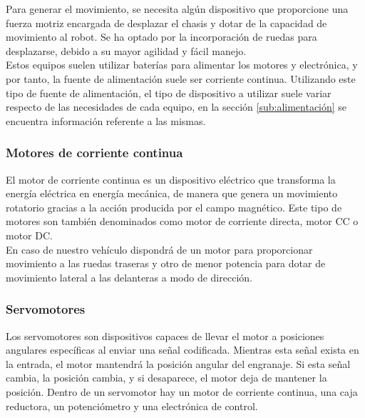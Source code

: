 Para generar el movimiento, se necesita algún dispositivo que proporcione una fuerza motriz encargada de desplazar el chasis y dotar de la capacidad de movimiento al robot.
Se ha optado por la incorporación de ruedas para desplazarse, debido a su mayor agilidad y fácil manejo.\\

Estos equipos suelen utilizar baterías para alimentar los motores y electrónica, y por tanto, la fuente de alimentación suele ser corriente continua. Utilizando este tipo de fuente de alimentación, 
el tipo de dispositivo a utilizar suele variar respecto de las necesidades de cada equipo, en la sección \ref{sub:alimentación} se encuentra información referente a las mismas.

\subsubsection{Motores de corriente continua}

El motor de corriente continua es un dispositivo eléctrico que transforma la energía eléctrica en energía mecánica, de manera que genera un movimiento rotatorio gracias a la  
acción producida por el campo magnético. Este tipo de motores son también denominados como motor de corriente directa, motor CC o motor DC.\\

En caso de nuestro vehículo dispondrá de un motor para proporcionar movimiento a las ruedas traseras y otro de menor potencia para dotar de movimiento lateral a las delanteras a modo de dirección.

\subsubsection{Servomotores}

Los servomotores son dispositivos capaces de llevar el motor a posiciones angulares específicas al enviar una señal codificada. Mientras esta señal exista en la entrada, 
el  motor  mantendrá  la  posición  angular  del  engranaje. Si esta señal cambia, la posición cambia, y si desaparece, el motor deja de mantener la posición. Dentro de un servomotor hay un motor de corriente
continua, una caja reductora, un potenciómetro y una electrónica de control.\\

